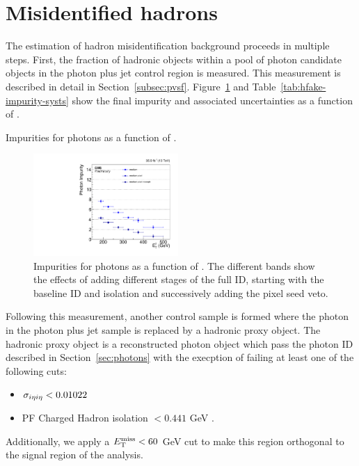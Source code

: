\section{Misidentified hadrons}
\label{sec:hfake}

The estimation of hadron misidentification background proceeds in multiple steps. 
First, the fraction of hadronic objects within a pool of photon candidate objects in the photon plus jet control region is measured. 
This measurement is described in detail in Section~\ref{subsec:pvsf}.
Figure~\ref{fig:impurity-compsb} and Table~\ref{tab:hfake-impurity-systs} show the final impurity and associated uncertainties as a function of \pt. 

\begin{table}[htbp]
  \centering
  
  \caption{Impurities for photons as a function of \pt.}
  \label{tab:hfake-impurity-systs}
\end{table}

\begin{figure}[htbp]
  \centering
  \includegraphics[width=0.49\textwidth]{Analysis/Figures/hfake/plot_impurity_barrel_medium.pdf}
    \caption{
    Impurities for photons as a function of \pt. 
    The different bands show the effects of adding different stages of the full ID, starting with the baseline ID and isolation and successively adding the pixel seed veto.
  }
  \label{fig:impurity-compsb}
\end{figure}

Following this measurement, another control sample is formed where the photon in the photon plus jet sample is replaced by a hadronic proxy object. 
The hadronic proxy object is a reconstructed photon object which pass the photon ID described in Section~\ref{sec:photons} with the execption of failing at least one of the following cuts: 
\begin{itemize}
\item $\sigma_{i\eta i\eta} < 0.01022$
\item PF Charged Hadron isolation $< 0.441$ GeV .
\end{itemize}
Additionally, we apply a $E_{\mathrm{T}}^{\text{miss}} < 60$ GeV cut to make this region orthogonal to the signal region of the analysis.
  

